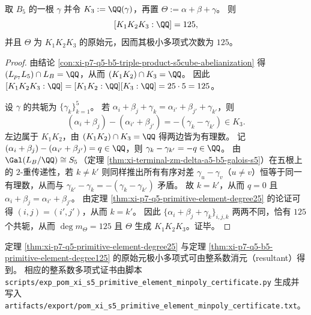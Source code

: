 \begin{theorem}[三个五次域的合成次数与原始元]\label{thm:xi-p7-q5-b5-primitive-element-degree125}
取 \(B_5\) 的一根 \(\gamma\) 并令 \(K_3:=\QQ(\gamma)\)，再置 \(\Theta:=\alpha+\beta+\gamma\)。
则
\[
[K_1K_2K_3:\QQ]=125,
\]
并且 \(\Theta\) 为 \(K_1K_2K_3\) 的原始元，因而其极小多项式次数为 \(125\)。
\end{theorem}
\begin{proof}
由结论 \ref{con:xi-p7-q5-b5-triple-product-s5cube-abelianization} 得 \((L_{p_7}L_5)\cap L_B=\QQ\)，从而 \((K_1K_2)\cap K_3=\QQ\)。
因此
\(
[K_1K_2K_3:\QQ]=[K_1K_2:\QQ][K_3:\QQ]=25\cdot 5=125
\)。
\par
设 \(\gamma\) 的共轭为 \(\{\gamma_k\}_{k=1}^5\)。
若
\(
\alpha_i+\beta_j+\gamma_k=\alpha_{i'}+\beta_{j'}+\gamma_{k'}
\)，则
\[
(\alpha_i+\beta_j)-(\alpha_{i'}+\beta_{j'})=-(\gamma_k-\gamma_{k'})\in K_3.
\]
左边属于 \(K_1K_2\)，由 \((K_1K_2)\cap K_3=\QQ\) 得两边皆为有理数。
记
\(
(\alpha_i+\beta_j)-(\alpha_{i'}+\beta_{j'})=q\in\QQ
\)，则 \(\gamma_k-\gamma_{k'}=-q\in\QQ\)。
由 \(\Gal(L_B/\QQ)\cong S_5\)（定理 \ref{thm:xi-terminal-zm-delta-a5-b5-galois-s5}）在五根上的 \(2\)-重传递性，若 \(k\neq k'\) 则同样推出所有有序对差 \(\gamma_u-\gamma_v\)（\(u\neq v\)）恒等于同一有理数，从而与 \(\gamma_{k'}-\gamma_k=-(\gamma_k-\gamma_{k'})\) 矛盾。
故 \(k=k'\)，从而 \(q=0\) 且 \(\alpha_i+\beta_j=\alpha_{i'}+\beta_{j'}\)。
由定理 \ref{thm:xi-p7-q5-primitive-element-degree25} 的论证可得 \((i,j)=(i',j')\)，从而 \(k=k'\)。
因此 \(\{\alpha_i+\beta_j+\gamma_k\}_{i,j,k}\) 两两不同，恰有 \(125\) 个共轭，从而 \(\deg m_\Theta=125\) 且 \(\Theta\) 生成 \(K_1K_2K_3\)。证毕。
\end{proof}

\begin{remark}\label{rem:xi-p7-q5-b5-primitive-element-minpoly-certificates}
定理 \ref{thm:xi-p7-q5-primitive-element-degree25} 与定理 \ref{thm:xi-p7-q5-b5-primitive-element-degree125} 的原始元极小多项式可由整系数消元（resultant）得到。
相应的整系数多项式证书由脚本 \texttt{scripts/exp\_pom\_xi\_s5\_primitive\_element\_minpoly\_certificate.py} 生成并写入
\texttt{artifacts/export/pom\_xi\_s5\_primitive\_element\_minpoly\_certificate.txt}。
\end{remark}

